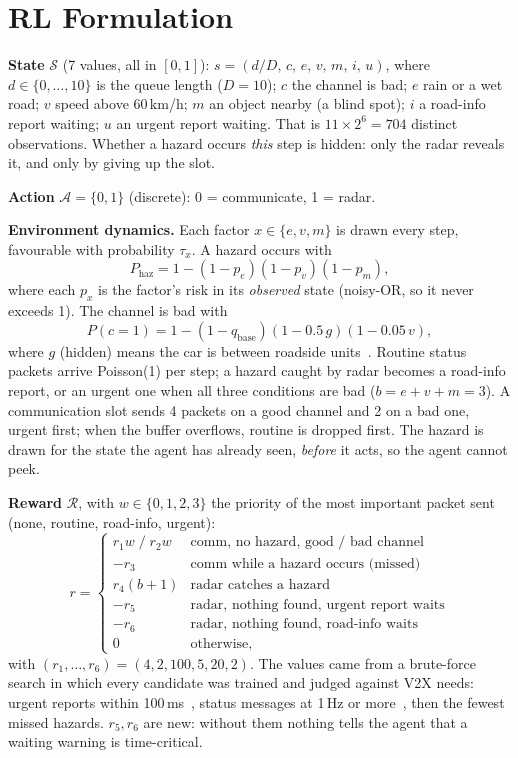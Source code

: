 \documentclass[10pt,conference]{IEEEtran}
\begin{document}
\section{RL Formulation}
\textbf{State} $\mathcal{S}$ (7 values, all in $[0,1]$):
$s=(d/D,\,c,\,e,\,v,\,m,\,i,\,u)$, where $d\in\{0,\dots,10\}$ is the queue
length ($D=10$); $c$ the channel is bad; $e$ rain or a wet road; $v$ speed above
60\,km/h; $m$ an object nearby (a blind spot); $i$ a road-info report waiting;
$u$ an urgent report waiting. That is $11\times2^6=704$ distinct observations.
Whether a hazard occurs \emph{this} step is hidden: only the radar reveals it,
and only by giving up the slot.

\textbf{Action} $\mathcal{A}=\{0,1\}$ (discrete): 0 = communicate, 1 = radar.

\textbf{Environment dynamics.} Each factor $x\in\{e,v,m\}$ is drawn every step,
favourable with probability $\tau_x$. A hazard occurs with
\begin{equation}
P_{\text{haz}} = 1-(1-p_e)(1-p_v)(1-p_m),
\end{equation}
where each $p_x$ is the factor's risk in its \emph{observed} state (noisy-OR,
so it never exceeds 1). The channel is bad with
\begin{equation}
P(c=1)=1-(1-q_{\text{base}})(1-0.5\,g)(1-0.05\,v),
\end{equation}
where $g$ (hidden) means the car is between roadside units~\cite{3gpp37885}.
Routine status packets arrive Poisson(1) per step; a hazard caught by radar
becomes a road-info report, or an urgent one when all three conditions are bad
($b=e+v+m=3$). A communication slot sends 4 packets on a good channel and 2 on
a bad one, urgent first; when the buffer overflows, routine is dropped first.
The hazard is drawn for the state the agent has already seen, \emph{before} it
acts, so the agent cannot peek.

\textbf{Reward} $\mathcal{R}$, with $w\in\{0,1,2,3\}$ the priority of the most
important packet sent (none, routine, road-info, urgent):
\begin{equation}
r=\begin{cases}
r_1 w \;/\; r_2 w & \text{comm, no hazard, good / bad channel}\\
-r_3 & \text{comm while a hazard occurs (missed)}\\
r_4(b+1) & \text{radar catches a hazard}\\
-r_5 & \text{radar, nothing found, urgent report waits}\\
-r_6 & \text{radar, nothing found, road-info waits}\\
0 & \text{otherwise,}
\end{cases}
\end{equation}
with $(r_1,\dots,r_6)=(4,2,100,5,20,2)$. The values came from a brute-force
search in which every candidate was trained and judged against V2X needs:
urgent reports within 100\,ms~\cite{3gpp22185}, status messages at 1\,Hz or
more~\cite{etsi302637-2}, then the fewest missed hazards. $r_5,r_6$ are new: without
them nothing tells the agent that a waiting warning is time-critical.
\end{document}
